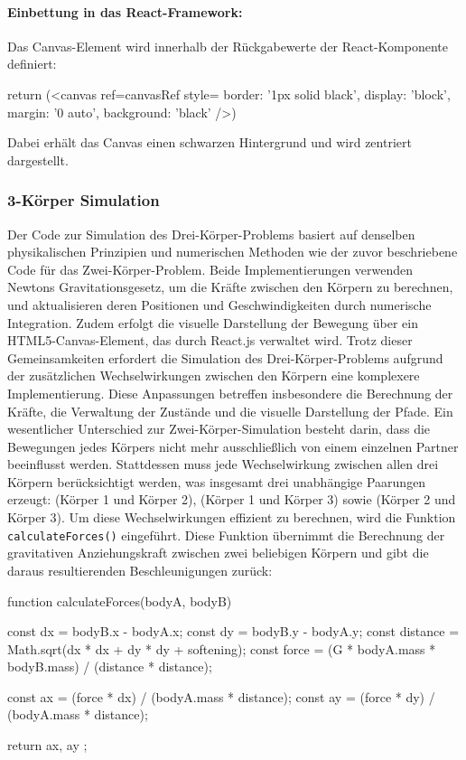 \documentclass[a4paper,12pt,twoside]{article}
\begin{document}
\paragraph{Einbettung in das React-Framework:}
Das Canvas-Element wird innerhalb der Rückgabewerte der React-Komponente definiert:

\begin{javascript}
return (<canvas ref={canvasRef} style={{ border: '1px solid black', display: 'block', margin: '0 auto', background: 'black' }} />)
\end{javascript}
Dabei erhält das Canvas einen schwarzen Hintergrund und wird zentriert dargestellt.


\subsubsection{3-Körper Simulation}
Der Code zur Simulation des Drei-Körper-Problems basiert auf denselben physikalischen Prinzipien und numerischen Methoden wie der zuvor beschriebene Code für das Zwei-Körper-Problem. Beide Implementierungen verwenden Newtons Gravitationsgesetz, um die Kräfte zwischen den Körpern zu berechnen, und aktualisieren deren Positionen und Geschwindigkeiten durch numerische Integration. Zudem erfolgt die visuelle Darstellung der Bewegung über ein HTML5-Canvas-Element, das durch React.js verwaltet wird. Trotz dieser Gemeinsamkeiten erfordert die Simulation des Drei-Körper-Problems aufgrund der zusätzlichen Wechselwirkungen zwischen den Körpern eine komplexere Implementierung. Diese Anpassungen betreffen insbesondere die Berechnung der Kräfte, die Verwaltung der Zustände und die visuelle Darstellung der Pfade.
Ein wesentlicher Unterschied zur Zwei-Körper-Simulation besteht darin, dass die Bewegungen jedes Körpers nicht mehr ausschließlich von einem einzelnen Partner beeinflusst werden. Stattdessen muss jede Wechselwirkung zwischen allen drei Körpern berücksichtigt werden, was insgesamt drei unabhängige Paarungen erzeugt: (Körper 1 und Körper 2), (Körper 1 und Körper 3) sowie (Körper 2 und Körper 3). Um diese Wechselwirkungen effizient zu berechnen, wird die Funktion \texttt{calculateForces()} eingeführt. Diese Funktion übernimmt die Berechnung der gravitativen Anziehungskraft zwischen zwei beliebigen Körpern und gibt die daraus resultierenden Beschleunigungen zurück:

\begin{javascript}
function calculateForces(bodyA, bodyB) {
    const dx = bodyB.x - bodyA.x;
    const dy = bodyB.y - bodyA.y;
    const distance = Math.sqrt(dx * dx + dy * dy + softening);
    const force = (G * bodyA.mass * bodyB.mass) / (distance * distance);

    const ax = (force * dx) / (bodyA.mass * distance);
    const ay = (force * dy) / (bodyA.mass * distance);

    return { ax, ay };
}
\end{javascript}
\end{document}
